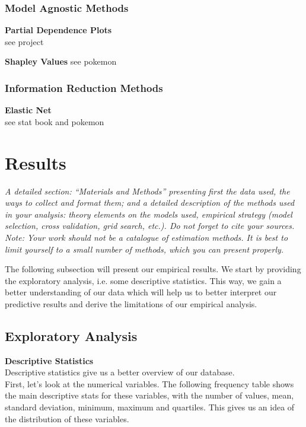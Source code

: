 \documentclass[12pt]{article}
\begin{document}
\subsubsection{Model Agnostic Methods}

\textbf{Partial Dependence Plots}\\
see project

\textbf{Shapley Values}
see pokemon

\subsubsection{Information Reduction Methods}


\noindent \textbf{Elastic Net}\\
see stat book and pokemon






\section{Results}
\textit{\noindent A detailed section: “Materials and Methods” presenting first the data used, the ways to collect and format them; and a detailed description of the methods used in your analysis: theory elements on the models used, empirical strategy (model selection, cross validation, grid search, etc.). Do not forget to cite your sources. Note: Your work should not be a catalogue of estimation methods. It is best to limit yourself to a small number of methods, which you can present properly.}

The following subsection will present our empirical results. We start by providing the exploratory analysis, i.e. some descriptive statistics. This way, we gain a better understanding of our data which will help us to better interpret our predictive results and derive the limitations of our empirical analysis.


\subsection{Exploratory Analysis}

\textbf{Descriptive Statistics}
~~\\
\noindent Descriptive statistics give us a better overview of our database.\\

\noindent First, let's look at the numerical variables. The following frequency table shows the main descriptive stats for these variables, with the number of values, mean, standard deviation, minimum, maximum and quartiles. This gives us an idea of the distribution of these variables.\\
\end{document}
